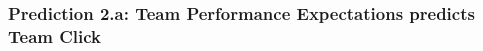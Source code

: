 \begin{CJK}{UTF8}{gbsn}
















       \subsubsection{Prediction 2.a: Team Performance Expectations predicts Team Click\label{app8:prediction2a}}



\end{CJK}
